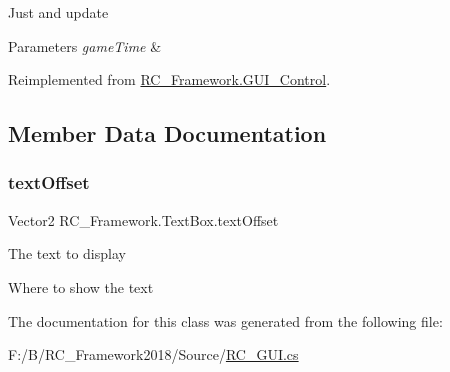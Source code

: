 Just and update 


\begin{DoxyParams}{Parameters}
{\em game\+Time} & \\
\hline
\end{DoxyParams}


Reimplemented from \mbox{\hyperlink{class_r_c___framework_1_1_g_u_i___control_a7aa3b0b6ba141d995ca830ff99ae3003}{R\+C\+\_\+\+Framework.\+G\+U\+I\+\_\+\+Control}}.



\subsection{Member Data Documentation}
\mbox{\label{class_r_c___framework_1_1_text_box_a9af3d3d79601df6df4fd8b83a1cda7e2}} 
\subsubsection{\texorpdfstring{text\+Offset}{textOffset}}
{\footnotesize\ttfamily Vector2 R\+C\+\_\+\+Framework.\+Text\+Box.\+text\+Offset}



The text to display 

Where to show the text 

The documentation for this class was generated from the following file\+:\begin{DoxyCompactItemize}
\item 
F\+:/\+B/\+R\+C\+\_\+\+Framework2018/\+Source/\mbox{\hyperlink{_r_c___g_u_i_8cs}{R\+C\+\_\+\+G\+U\+I.\+cs}}\end{DoxyCompactItemize}

